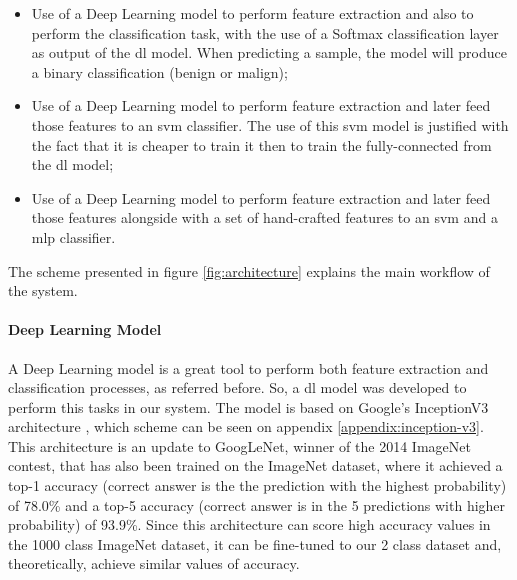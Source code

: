 \documentclass[
  twoside,
  11pt, a4paper,
  footinclude=true,
  headinclude=true,
  cleardoublepage=empty
]{scrbook}
\begin{document}
        \begin{itemize}
          \item Use of a Deep Learning model to perform feature extraction and also to perform the classification task, with the use of a Softmax classification layer as output of the \gls{dl} model. When predicting a sample, the model will produce a binary classification (benign or malign);
          \item Use of a Deep Learning model to perform feature extraction and later feed those features to an \gls{svm} classifier. The use of this \gls{svm} model is justified with the fact that it is cheaper to train it then to train the fully-connected from the \gls{dl} model;
          \item Use of a Deep Learning model to perform feature extraction and later feed those features alongside with a set of hand-crafted features to an \gls{svm} and a \gls{mlp} classifier.
        \end{itemize}

        The scheme presented in figure \ref{fig:architecture} explains the main workflow of the system.


        \paragraph{Deep Learning Model}
          A Deep Learning model is a great tool to perform both feature extraction and classification processes, as referred before. So, a \gls{dl} model was developed to perform this tasks in our system. The model is based on Google's InceptionV3 architecture \cite{szegedy2015rethinking}, which scheme can be seen on appendix \ref{appendix:inception-v3}. This architecture is an update to GoogLeNet, winner of the 2014 ImageNet contest, that has also been trained on the ImageNet dataset, where it achieved a top-1 accuracy (correct answer is the the prediction with the highest probability) of 78.0\% and a top-5 accuracy (correct answer is in the 5 predictions with higher probability) of 93.9\%. Since this architecture can score high accuracy values in the 1000 class ImageNet dataset, it can be fine-tuned to our 2 class dataset and, theoretically, achieve similar values of accuracy.
\end{document}
